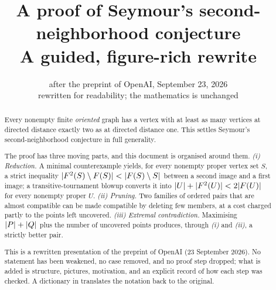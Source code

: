 \documentclass[11pt,a4paper]{article}
\title{\bfseries A proof of Seymour's second-neighborhood conjecture\\[2pt]
\large A guided, figure-rich rewrite}
\author{after the preprint of OpenAI, September 23, 2026\\[2pt]
\small rewritten for readability; the mathematics is unchanged}
\date{}
\begin{document}
\maketitle

\begin{abstract}
\noindent
Every nonempty finite \emph{oriented} graph has a vertex with at least as many vertices at
directed distance exactly two as at directed distance one. This settles Seymour's
second-neighborhood conjecture in full generality.

\smallskip
\noindent
The proof has three moving parts, and this document is organised around them.
\emph{(i) Reduction.} A minimal counterexample yields, for every nonempty proper vertex set
$S$, a strict inequality $\lvert F^2(S)\setminus F(S)\rvert<\lvert F(S)\setminus S\rvert$ between a second
image and a first image; a transitive-tournament blowup converts it into
$\lvert U\rvert+\lvert F^2(U)\rvert<2\lvert F(U)\rvert$ for every nonempty proper $U$.
\emph{(ii) Pruning.} Two families of ordered pairs that are almost compatible can be made
compatible by deleting few members, at a cost charged partly to the points left uncovered.
\emph{(iii) Extremal contradiction.} Maximising $\lvert P\rvert+\lvert Q\rvert$ plus the number of uncovered
points produces, through \emph{(i)} and \emph{(ii)}, a strictly better pair.

\smallskip
\noindent
This is a rewritten presentation of the preprint of OpenAI (23 September 2026). No statement
has been weakened, no case removed, and no proof step dropped; what is added is structure,
pictures, motivation, and an explicit record of how each step was checked. A dictionary in
 translates the notation back to the original.
\end{abstract}

\tableofcontents
\bigskip













\end{document}

